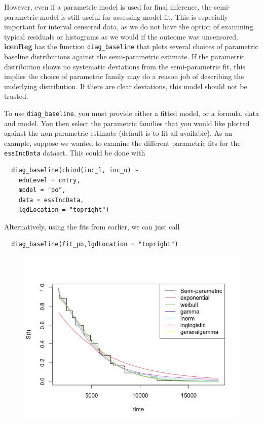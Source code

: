 \documentclass[11pt]{report}
\begin{document}
  However, even if a parametric model is used for final inference, the semi-parametric model
  is still useful for assessing model fit. This is especially important for interval censored
  data, as we do not have the option of examining typical residuals or histograms as we would
  if the outcome was uncensored. {\bf icenReg} has the function \texttt{diag\_baseline} that plots 
  several choices of parametric baseline distributions against the semi-parametric estimate. 
  If the parametric distribution shows no systematic deviations from the semi-parametric
  fit, this implies the choice of parametric family may do a reason job of describing the 
  underlying distribution. If there are clear deviations, this model should not be trusted. 
  
  To use \texttt{diag\_baseline}, you must provide either a fitted model, or a formula,
  data and model. You then select the parametric families that you would like plotted 
  against the non-parametric estimate (default is to fit all available).
  As an example, suppose we wanted to 
  examine the different parametric fits for the \texttt{essIncData} dataset. This could 
  be done with 
  
  \begin{verbatim}
  diag_baseline(cbind(inc_l, inc_u) ~
    eduLevel + cntry,
    model = "po",
    data = essIncData,
    lgdLocation = "topright")
  \end{verbatim}
  
  Alternatively, using the fits from earlier, we can just call
  
  \begin{verbatim}
  diag_baseline(fit_po,lgdLocation = "topright")
  \end{verbatim}
  
  \begin{figure}
  \includegraphics{diagBaseline.png}
  \label{figure:diagBase}
  \end{figure}
  
\end{document}
